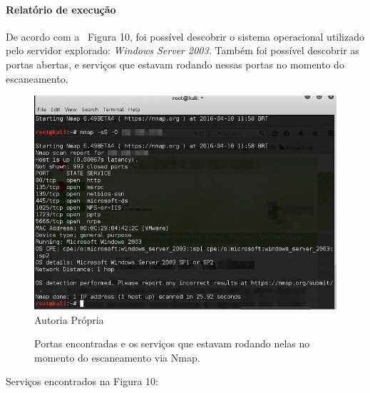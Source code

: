 \documentclass[
    12pt,               %
    openright,          %
    oneside,            %
    a4paper,            %
    section=TITLE,     %
    english,            %
    french,             %
    spanish,            %
    brazil              %
    ]{abntex2}
\def\ffcaptionfontsize{\footnotesize}
\begin{document}
\paragraph*{Relatório de execução}

De acordo com a ~Figura 10, foi possível descobrir o sistema operacional utilizado pelo servidor explorado: \emph{Windows Server 2003.} Também foi possível descobrir as portas abertas, e serviços que estavam rodando nessas portas no momento do escaneamento.





\begin{figure}[htp]
\centering
\caption{Portas encontradas e os serviços que estavam rodando nelas no momento do escaneamento via Nmap.}
\includegraphics[width=450px]{image4.jpeg}
\vspace{.5\baselineskip}\\
\ffcaptionfontsize Autoria Própria
\end{figure}
\ifdefined\FloatBarrier \FloatBarrier \fi





Serviços encontrados na Figura 10:
\end{document}
